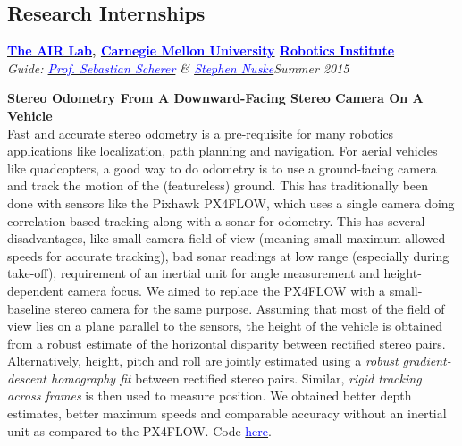 \documentclass[margin,line]{res}
\newenvironment{list1}{
  \begin{list}{\ding{113}}{%
      \setlength{\itemsep}{0in}
      \setlength{\parsep}{0in} \setlength{\parskip}{0in}
      \setlength{\topsep}{0in} \setlength{\partopsep}{0in} 
      \setlength{\leftmargin}{0.17in}}}{\end{list}}
\begin{document}
\begin{resume}
\section{\sc Research Internships} 

{\bf  \href{http://theairlab.org/}{\textcolor{blue}{The AIR Lab}}, \href{http://www.cmu.edu/}{\textcolor{blue}{Carnegie Mellon University}} \href{http://ri.cmu.edu/}{\textcolor{blue}{Robotics Institute}}} \\
{\em Guide: \href{http://www.ri.cmu.edu/person.html?person_id=1397}{\textcolor{blue}{Prof. Sebastian Scherer}} \& \href{http://www.ri.cmu.edu/person.html?person_id=2128}{\textcolor{blue} {Stephen Nuske}}}\hfill\textit{Summer 2015} \\
\vspace*{-.13in}
\begin{list1}
\item[]\textbf{Stereo Odometry From A Downward-Facing Stereo Camera On A Vehicle} \\
Fast and accurate stereo odometry is a pre-requisite for many robotics applications like localization, path planning and navigation. For aerial vehicles like quadcopters, a good way to do odometry is to use a ground-facing camera and track the motion of the (featureless) ground. This has traditionally been done with sensors like the Pixhawk PX4FLOW, which uses a single camera doing correlation-based tracking along with a sonar for odometry. This has several disadvantages, like small camera field of view (meaning small maximum allowed speeds for accurate tracking), bad sonar readings at low range (especially during take-off), requirement of an inertial unit for angle measurement and height-dependent camera focus. We aimed to replace the PX4FLOW with a small-baseline stereo camera for the same purpose. Assuming that most of the field of view lies on a plane parallel to the sensors, the height of the vehicle is obtained from a robust estimate of the horizontal disparity between rectified stereo pairs. Alternatively, height, pitch and roll are jointly estimated using a \textit{robust gradient-descent homography fit} between rectified stereo pairs. Similar, \textit{rigid tracking across frames} is then used to measure position. We obtained better depth estimates, better maximum speeds and comparable accuracy without an inertial unit as compared to the PX4FLOW. Code \href{https://github.com/alankarkotwal/ground_odom}{\textcolor{blue} {here}}.
\end{list1}


\end{resume}
\end{document}

